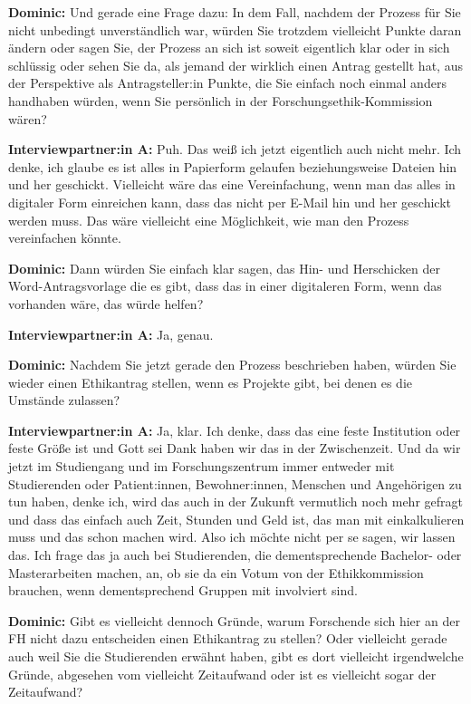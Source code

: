 \documentclass[a4paper,12pt,twoside]{scrreprt}
\begin{document}
\textbf{Dominic:} Und gerade eine Frage dazu: In dem Fall, nachdem der Prozess für Sie nicht unbedingt unverständlich war, würden Sie trotzdem vielleicht Punkte daran ändern oder sagen Sie, der Prozess an sich ist soweit eigentlich klar oder in sich schlüssig oder sehen Sie da, als jemand der wirklich einen Antrag gestellt hat, aus der Perspektive als Antragsteller:in Punkte, die Sie einfach noch einmal anders handhaben würden, wenn Sie persönlich in der Forschungsethik-Kommission wären?

\textbf{Interviewpartner:in A:} Puh. Das weiß ich jetzt eigentlich auch nicht mehr. Ich denke, ich glaube es ist alles in Papierform gelaufen beziehungsweise Dateien hin und her geschickt. Vielleicht wäre das eine Vereinfachung, wenn man das alles in digitaler Form einreichen kann, dass das nicht per E-Mail hin und her geschickt werden muss. Das wäre vielleicht eine Möglichkeit, wie man den Prozess vereinfachen könnte.

\textbf{Dominic:} Dann würden Sie einfach klar sagen, das Hin- und Herschicken der Word-Antragsvorlage die es gibt, dass das in einer digitaleren Form, wenn das vorhanden wäre, das würde helfen?

\textbf{Interviewpartner:in A:} Ja, genau.

\textbf{Dominic:} Nachdem Sie jetzt gerade den Prozess beschrieben haben, würden Sie wieder einen Ethikantrag stellen, wenn es Projekte gibt, bei denen es die Umstände zulassen?

\textbf{Interviewpartner:in A:} Ja, klar. Ich denke, dass das eine feste Institution oder feste Größe ist und Gott sei Dank haben wir das in der Zwischenzeit. Und da wir jetzt im Studiengang und im Forschungszentrum immer entweder mit Studierenden oder Patient:innen, Bewohner:innen, Menschen und Angehörigen zu tun haben, denke ich, wird das auch in der Zukunft vermutlich noch mehr gefragt und dass das einfach auch Zeit, Stunden und Geld ist, das man mit einkalkulieren muss und das schon machen wird. Also ich möchte nicht per se sagen, wir lassen das. Ich frage das ja auch bei Studierenden, die dementsprechende Bachelor- oder Masterarbeiten machen, an, ob sie da ein Votum von der Ethikkommission brauchen, wenn dementsprechend Gruppen mit involviert sind.

\textbf{Dominic:} Gibt es vielleicht dennoch Gründe, warum Forschende sich hier an der FH nicht dazu entscheiden einen Ethikantrag zu stellen? Oder vielleicht gerade auch weil Sie die Studierenden erwähnt haben, gibt es dort vielleicht irgendwelche Gründe, abgesehen vom vielleicht Zeitaufwand oder ist es vielleicht sogar der Zeitaufwand?
\end{document}
